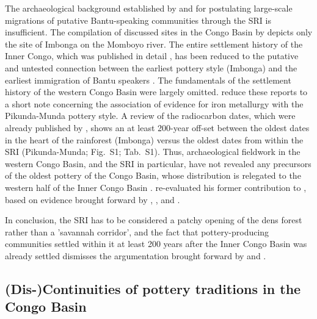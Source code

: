 \documentclass[smallextended,natbib]{svjour3}       %
\begin{document}
The archaeological background established by \citet{Grollemund.2015} and \citet{Bostoen.2015} for postulating large-scale migrations of putative Bantu-speaking communities through the SRI is insufficient. The compilation of discussed sites in the Congo Basin by \citet[356 Fig.~1]{Bostoen.2015} depicts only the site of Imbonga on the Momboyo river. The entire settlement history of the Inner Congo, which was published in detail \citep{Eggert.1984,Eggert.1987c,Wotzka.1995}, has been reduced to the putative and untested connection between the earliest pottery style (Imbonga) and the earliest immigration of Bantu speakers \citep[366]{Bostoen.2015}. The fundamentals of the settlement history of the western Congo Basin \citet{Eggert.1992,Eggert.1993} were largely omitted. \citet[364]{Bostoen.2015} reduce these reports to a short note concerning the association of evidence for iron metallurgy with the Pikunda-Munda pottery style. A review of the radiocarbon dates, which were already published by \citet{Eggert.1992,Eggert.1993}, shows an at least 200-year off-set between the oldest dates in the heart of the rainforest (Imbonga) versus the oldest dates from within the SRI (Pikunda-Munda; Fig.~S1; Tab.~S1). Thus, archaeological fieldwork in the western Congo Basin, and the SRI in particular, have not revealed any precursors of the oldest pottery of the Congo Basin, whose distribution is relegated to the western half of the Inner Congo Basin \citep[220 Fig.~100A]{Seidensticker.2021e}. \citet[66--67]{Clist.2022} re-evaluated his former contribution to \citet{Bostoen.2015}, based on evidence brought forward by \citet{MorinRivat.2014}, \citet{Seidensticker.2016b}, and \citet{Giresse.2020}.

In conclusion, the SRI has to be considered a patchy opening of the dens forest rather than a 'savannah corridor', and the fact that pottery-producing communities settled within it at least 200 years after the Inner Congo Basin was already settled dismisses the argumentation brought forward by \citet{Grollemund.2015} and \citet{Bostoen.2015}.

\subsection*{(Dis-)Continuities of pottery traditions in the Congo Basin}
\end{document}

